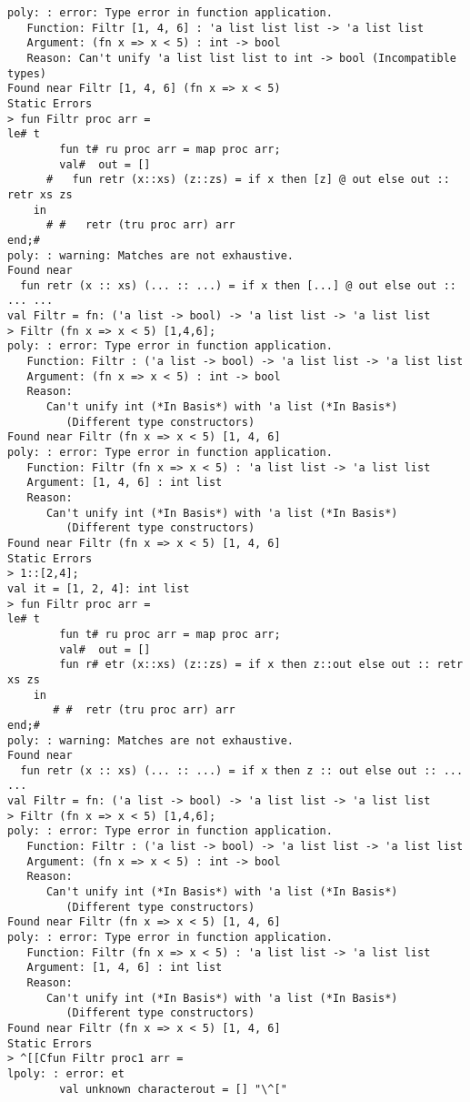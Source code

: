 \documentclass[twoside]{report}
\begin{document}
\begin{scriptsize}
\begin{verbatim}
poly: : error: Type error in function application.
   Function: Filtr [1, 4, 6] : 'a list list list -> 'a list list
   Argument: (fn x => x < 5) : int -> bool
   Reason: Can't unify 'a list list list to int -> bool (Incompatible types)
Found near Filtr [1, 4, 6] (fn x => x < 5)
Static Errors
> fun Filtr proc arr =
le# t
        fun t# ru proc arr = map proc arr;
        val#  out = []
      #   fun retr (x::xs) (z::zs) = if x then [z] @ out else out :: retr xs zs
    in
      # #   retr (tru proc arr) arr
end;#
poly: : warning: Matches are not exhaustive.
Found near
  fun retr (x :: xs) (... :: ...) = if x then [...] @ out else out :: ... ...
val Filtr = fn: ('a list -> bool) -> 'a list list -> 'a list list
> Filtr (fn x => x < 5) [1,4,6];
poly: : error: Type error in function application.
   Function: Filtr : ('a list -> bool) -> 'a list list -> 'a list list
   Argument: (fn x => x < 5) : int -> bool
   Reason:
      Can't unify int (*In Basis*) with 'a list (*In Basis*)
         (Different type constructors)
Found near Filtr (fn x => x < 5) [1, 4, 6]
poly: : error: Type error in function application.
   Function: Filtr (fn x => x < 5) : 'a list list -> 'a list list
   Argument: [1, 4, 6] : int list
   Reason:
      Can't unify int (*In Basis*) with 'a list (*In Basis*)
         (Different type constructors)
Found near Filtr (fn x => x < 5) [1, 4, 6]
Static Errors
> 1::[2,4];
val it = [1, 2, 4]: int list
> fun Filtr proc arr =
le# t
        fun t# ru proc arr = map proc arr;
        val#  out = []
        fun r# etr (x::xs) (z::zs) = if x then z::out else out :: retr xs zs
    in
       # #  retr (tru proc arr) arr
end;#
poly: : warning: Matches are not exhaustive.
Found near
  fun retr (x :: xs) (... :: ...) = if x then z :: out else out :: ... ...
val Filtr = fn: ('a list -> bool) -> 'a list list -> 'a list list
> Filtr (fn x => x < 5) [1,4,6];
poly: : error: Type error in function application.
   Function: Filtr : ('a list -> bool) -> 'a list list -> 'a list list
   Argument: (fn x => x < 5) : int -> bool
   Reason:
      Can't unify int (*In Basis*) with 'a list (*In Basis*)
         (Different type constructors)
Found near Filtr (fn x => x < 5) [1, 4, 6]
poly: : error: Type error in function application.
   Function: Filtr (fn x => x < 5) : 'a list list -> 'a list list
   Argument: [1, 4, 6] : int list
   Reason:
      Can't unify int (*In Basis*) with 'a list (*In Basis*)
         (Different type constructors)
Found near Filtr (fn x => x < 5) [1, 4, 6]
Static Errors
> ^[[Cfun Filtr proc1 arr =
lpoly: : error: et
        val unknown characterout = [] "\^["


\end{verbatim}
\end{scriptsize}
\end{document}
